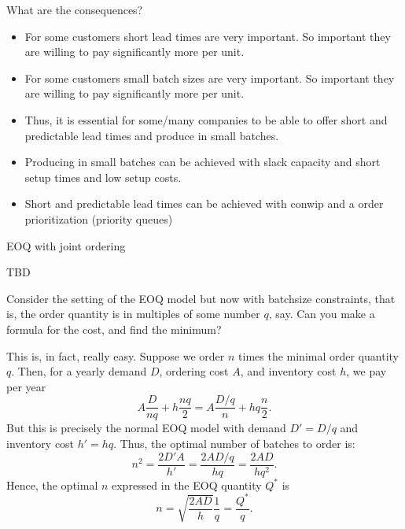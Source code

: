 \begin{exercise}
\begin{solution}
What are the consequences?

 \begin{itemize}
   \item For some customers short lead times are very important. So important
     they are willing to pay significantly more per unit.
   \item For some customers small batch sizes are very important. So
     important they are willing to pay significantly more per unit.
   \item Thus,  it is essential for some/many companies to be
     able to offer short and predictable lead times and produce in
     small batches.
   \item Producing in small batches can be achieved with slack capacity and short setup times and low setup costs.
   \item Short and predictable lead times can be achieved with conwip
     and a order prioritization (priority queues)
 \end{itemize}
\end{solution}
\end{exercise}





\begin{exercise}
EOQ with joint ordering
  \begin{solution}
    TBD
  \end{solution}
\end{exercise}

\begin{exercise}
  Consider the setting of the EOQ model but now with batchsize
  constraints, that is, the order quantity is in multiples of some number $q$, say. Can you make a formula for the cost, and find the minimum?
  \begin{solution}
This is, in fact, really easy. Suppose we order $n$ times the minimal order quantity $q$. Then, for a yearly demand $D$, ordering cost $A$, and inventory cost $h$, we pay per year
\begin{equation*}
  A \frac{D}{nq} + h\frac{nq}2 = A\frac{D/q}n + hq\frac{n}2.
\end{equation*}
But this is precisely the normal EOQ model with demand $D'=D/q$ and inventory cost $h'=hq$. Thus, the optimal number of batches to order is:
\begin{equation*}
  n^2 = \frac{2D'A}{h'} = \frac{2AD/q}{hq} = \frac{2AD}{hq^2}.
\end{equation*}
Hence, the optimal $n$ expressed in the EOQ quantity $Q^*$ is 
\begin{equation*}
  n = \sqrt{\frac{2AD}{h}}\frac1q=\frac{Q^*}q.
\end{equation*}
  \end{solution}
\end{exercise}


